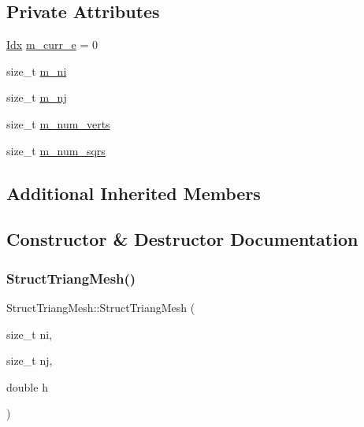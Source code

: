\subsection*{Private Attributes}
\begin{DoxyCompactItemize}
\item 
\hyperlink{Includes_8h_ae78891cd308078a2f5f9e7193065c805}{Idx} \hyperlink{structStructTriangMesh_a7492e3e7b7433a137a80a73436f708af}{m\+\_\+curr\+\_\+e} = 0
\item 
size\+\_\+t \hyperlink{structStructTriangMesh_a0d1bd661119f208c508bcba634eea9cb}{m\+\_\+ni}
\item 
size\+\_\+t \hyperlink{structStructTriangMesh_a77ad7c793fcf436ce95ff863a21112a8}{m\+\_\+nj}
\item 
size\+\_\+t \hyperlink{structStructTriangMesh_a737630cba79f3c0b1aca424f7ec55a6c}{m\+\_\+num\+\_\+verts}
\item 
size\+\_\+t \hyperlink{structStructTriangMesh_aa774f135ebcd3735ba4b16a3af908aa4}{m\+\_\+num\+\_\+sqrs}
\end{DoxyCompactItemize}
\subsection*{Additional Inherited Members}


\subsection{Constructor \& Destructor Documentation}
\mbox{\label{structStructTriangMesh_aa36ad523618a9904d7fedd87db959d2b}} 
\subsubsection{\texorpdfstring{Struct\+Triang\+Mesh()}{StructTriangMesh()}}
{\footnotesize\ttfamily Struct\+Triang\+Mesh\+::\+Struct\+Triang\+Mesh (\begin{DoxyParamCaption}\item[{size\+\_\+t}]{ni,  }\item[{size\+\_\+t}]{nj,  }\item[{double}]{h }\end{DoxyParamCaption})}



